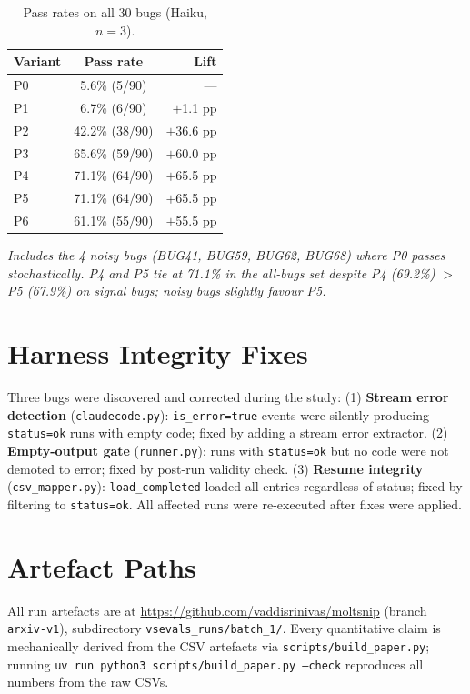 \documentclass[10pt,conference]{IEEEtran}
\begin{document}
\begin{table}[t]
\centering
\caption{Pass rates on all 30 bugs (Haiku, $n{=}3$).}
\label{tab:all-bugs}
\small
\begin{tabular}{@{}lcr@{}}
\toprule
\textbf{Variant} & \textbf{Pass rate} & \textbf{Lift} \\
\midrule
P0 & 5.6\% (5/90)   & ---         \\
P1 & 6.7\% (6/90)   & $+$1.1 pp   \\
P2 & 42.2\% (38/90) & $+$36.6 pp  \\
P3 & 65.6\% (59/90) & $+$60.0 pp  \\
P4 & 71.1\% (64/90) & $+$65.5 pp  \\
P5 & 71.1\% (64/90) & $+$65.5 pp  \\
P6 & 61.1\% (55/90) & $+$55.5 pp  \\
\bottomrule
\end{tabular}
\end{table}

\emph{Includes the 4 noisy bugs (BUG41, BUG59, BUG62, BUG68) where P0 passes stochastically. P4 and P5 tie at 71.1\% in the all-bugs set despite P4 (69.2\%) $>$ P5 (67.9\%) on signal bugs; noisy bugs slightly favour P5.}

\section{Harness Integrity Fixes}
\label{app:harness-fixes}

Three bugs were discovered and corrected during the study:
(1) \textbf{Stream error detection} (\texttt{claudecode.py}): \texttt{is\_error=true} events were silently producing \texttt{status=ok} runs with empty code; fixed by adding a stream error extractor.
(2) \textbf{Empty-output gate} (\texttt{runner.py}): runs with \texttt{status=ok} but no code were not demoted to error; fixed by post-run validity check.
(3) \textbf{Resume integrity} (\texttt{csv\_mapper.py}): \texttt{load\_completed} loaded all entries regardless of status; fixed by filtering to \texttt{status=ok}.
All affected runs were re-executed after fixes were applied.

\section{Artefact Paths}
\label{app:artefacts}

All run artefacts are at \url{https://github.com/vaddisrinivas/moltsnip} (branch \texttt{arxiv-v1}), subdirectory \texttt{vsevals\_runs/batch\_1/}.
Every quantitative claim is mechanically derived from the CSV artefacts via \texttt{scripts/build\_paper.py};
running \texttt{uv run python3 scripts/build\_paper.py --check} reproduces all numbers from the raw CSVs.
\end{document}
